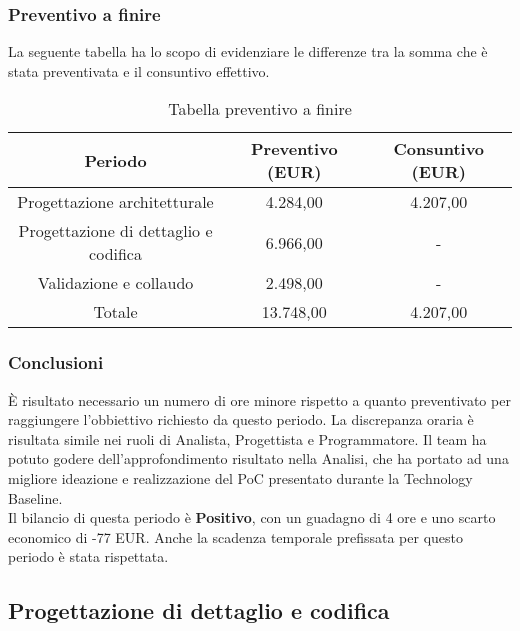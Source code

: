 \subsubsection{Preventivo a finire}
La seguente tabella ha lo scopo di evidenziare le differenze tra la somma che è stata preventivata e il consuntivo effettivo.
\begin{table}[h]
	\caption{Tabella preventivo a finire}  
	\begin{center}
		\begin{tabular}{ |c|c|c|  }
			\hline
			Periodo 								& Preventivo (EUR) & Consuntivo (EUR)\\
			\hline\hline
			Progettazione architetturale			& 4.284,00 				& 4.207,00\\
			Progettazione di dettaglio e codifica	& 6.966,00 			& -\\
			Validazione e collaudo					& 2.498,00 			& -\\
			\hline\hline
			Totale									& 13.748,00 				& 4.207,00 \\
			\hline
		\end{tabular}
	\end{center}
\end{table}
 

\subsubsection{Conclusioni}
È risultato necessario un numero di ore minore rispetto a quanto preventivato per raggiungere l'obbiettivo richiesto da questo periodo. La discrepanza oraria è risultata simile nei ruoli di Analista, Progettista e Programmatore. Il team ha potuto godere dell'approfondimento risultato nella Analisi, che ha portato ad una migliore ideazione e realizzazione del PoC presentato durante la Technology Baseline.
\\Il bilancio di questa periodo è \textbf{Positivo}, con un guadagno di 4 ore e uno scarto economico di -77 EUR. Anche la scadenza temporale prefissata per questo periodo è stata rispettata.
\subsection{Progettazione di dettaglio e codifica}
